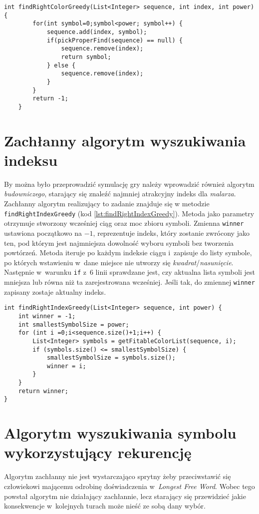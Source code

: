 \documentclass[document]{xmgr}
\begin{document}
\begin{lstlisting}[caption={Metoda zachłannie szukająca symbolu.},label=lst:findRightColorGreedy]
int findRightColorGreedy(List<Integer> sequence, int index, int power) {
		for(int symbol=0;symbol<power; symbol++) {
			sequence.add(index, symbol);
			if(pickProperFind(sequence) == null) {
				sequence.remove(index);
				return symbol;
			} else {
				sequence.remove(index);
			}
		}
		return -1;
	}
\end{lstlisting}

\newpage
\section{Zachłanny algorytm wyszukiwania indeksu}
By można było przeprowadzić symulację gry należy wprowadzić również algorytm \emph{budowniczego}, starający się znaleźć najmniej atrakcyjny indeks dla \emph{malarza}. Zachłanny algorytm realizujący to zadanie znajduje się w metodzie \texttt{findRightIndexGreedy} (kod \ref{lst:findRightIndexGreedy}). Metoda jako parametry otrzymuje stworzony wcześniej ciąg oraz moc zbioru symboli. Zmienna \texttt{winner} ustawiona początkowo na $-1$, reprezentuje indeks, który zostanie zwrócony jako ten, pod którym jest najmniejsza dowolność wyboru symboli bez tworzenia powtórzeń. Metoda iteruje po każdym indeksie ciągu i~zapisuje do listy symbole, po których wstawieniu w~dane miejsce nie utworzy się \emph{kwadrat}/\emph{nasunięcie}. Następnie w~warunku \texttt{if} z~6 linii sprawdzane jest, czy aktualna lista symboli jest mniejsza lub równa niż ta zarejestrowana wcześniej. Jeśli tak, do zmiennej \texttt{winner} zapisany zostaje aktualny indeks.

\begin{lstlisting}[caption={Metoda zachłannie szukająca indeksu.},label=lst:findRightIndexGreedy]
int findRightIndexGreedy(List<Integer> sequence, int power) {
	int winner = -1;
	int smallestSymbolSize = power;
	for (int i =0;i<sequence.size()+1;i++) {
		List<Integer> symbols = getFitableColorList(sequence, i);
		if (symbols.size() <= smallestSymbolSize) {
			smallestSymbolSize = symbols.size();
			winner = i;
		}
	}
	return winner;
}
\end{lstlisting}
\clearpage
\section{Algorytm wyszukiwania symbolu wykorzystujący rekurencję}
Algorytm zachłanny nie jest wystarczająco sprytny żeby przeciwstawić się człowiekowi mającemu odrobinę doświadczenia w~\emph{Longest Free Word}. Wobec tego powstał algorytm nie działający zachłannie, lecz starający się przewidzieć jakie konsekwencje w~kolejnych turach może nieść ze sobą dany wybór.
\end{document}
